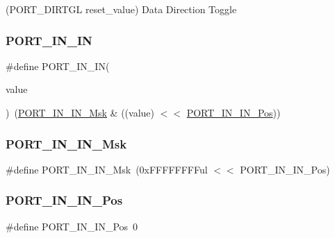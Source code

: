 (P\+O\+R\+T\+\_\+\+D\+I\+R\+T\+GL reset\+\_\+value) Data Direction Toggle 

\mbox{\label{group___s_a_m_d21___p_o_r_t_gaf81b4172c78721d9834973dddc4841cf}} 
\subsubsection{\texorpdfstring{PORT\_IN\_IN}{PORT\_IN\_IN}}
{\footnotesize\ttfamily \#define P\+O\+R\+T\+\_\+\+I\+N\+\_\+\+IN(\begin{DoxyParamCaption}\item[{}]{value }\end{DoxyParamCaption})~(\mbox{\hyperlink{group___s_a_m_d21___p_o_r_t_gafc8e8de4e1098dd2f63a5fb99e7a915f}{P\+O\+R\+T\+\_\+\+I\+N\+\_\+\+I\+N\+\_\+\+Msk}} \& ((value) $<$$<$ \mbox{\hyperlink{group___s_a_m_d21___p_o_r_t_ga39fa578b833d4c48b8090804a97c918b}{P\+O\+R\+T\+\_\+\+I\+N\+\_\+\+I\+N\+\_\+\+Pos}}))}

\mbox{\label{group___s_a_m_d21___p_o_r_t_gafc8e8de4e1098dd2f63a5fb99e7a915f}} 
\subsubsection{\texorpdfstring{PORT\_IN\_IN\_Msk}{PORT\_IN\_IN\_Msk}}
{\footnotesize\ttfamily \#define P\+O\+R\+T\+\_\+\+I\+N\+\_\+\+I\+N\+\_\+\+Msk~(0x\+F\+F\+F\+F\+F\+F\+F\+Ful $<$$<$ P\+O\+R\+T\+\_\+\+I\+N\+\_\+\+I\+N\+\_\+\+Pos)}

\mbox{\label{group___s_a_m_d21___p_o_r_t_ga39fa578b833d4c48b8090804a97c918b}} 
\subsubsection{\texorpdfstring{PORT\_IN\_IN\_Pos}{PORT\_IN\_IN\_Pos}}
{\footnotesize\ttfamily \#define P\+O\+R\+T\+\_\+\+I\+N\+\_\+\+I\+N\+\_\+\+Pos~0}




